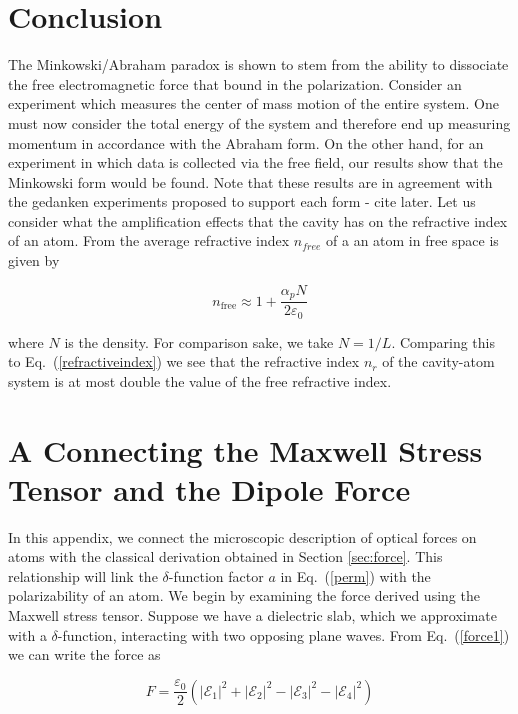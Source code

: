 \documentclass[twocolumn,english,pra,aps,superscriptaddress,floatfix]{revtex4-1}
\begin{document}
\section{Conclusion}
\label{sec:conclusion}

The Minkowski/Abraham paradox is shown to stem from the ability to dissociate the free electromagnetic force that bound in the polarization.  Consider an experiment which measures the center of mass motion of the entire system. One must now consider the total energy of the system and therefore end up measuring 
momentum in accordance with the Abraham form.  On the other hand, for an experiment in which data is collected via the free field, our results show that 
the Minkowski form would be found.  Note that these results are in agreement with
the gedanken experiments proposed to support each form - cite later.  
Let us consider what the amplification effects that the cavity has on the refractive index of an atom.  From \cite{cohentannoudji} the average refractive index $n_{free}$ of a an atom in free space is given by

\begin{equation}
n_{\mathrm{free}}\approx 1+\frac{\alpha_{p}N}{2\varepsilon_{0}}
\end{equation}

where $N$ is the density.  For comparison sake, we take $N=1/L$.  Comparing this to Eq.\ (\ref{refractiveindex}) we see that the refractive index $n_{r}$ of the cavity-atom system is at most double the value of the free refractive index. 

\section{A Connecting the Maxwell Stress Tensor and the Dipole Force}
\label{sec:AppendixAMaxwellvsQOforce}


In this appendix, we connect the microscopic description of optical forces on atoms \cite{cohentannoudji} with the classical derivation obtained in Section \ref{sec:force}.  
This relationship will link the $\delta$-function factor $a$ in Eq.\ (\ref{perm}) with the polarizability of an atom. We begin by examining the force 
derived using the Maxwell stress tensor.  Suppose we have a dielectric slab, which we approximate with a $\delta$-function, interacting with two opposing plane waves. 
From Eq.\ (\ref{force1}) we can write the force as

\begin{equation}
F=\frac{\varepsilon_{0}}{2}\left(\left|\mathcal{E}_{1}\right|^{2}+\left|\mathcal{E}_{2}\right|^{2}-\left|\mathcal{E}_{3}\right|^{2}-\left|\mathcal{E}_{4}\right|^{2}\right)
\label{Gaussianforce}
\end{equation}
\end{document}

